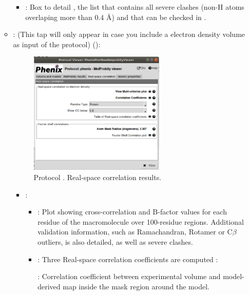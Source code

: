 \begin{itemize}
\begin{itemize}
\begin{itemize}
         \item {}: Box to detail , the list that contains all severe clashes (non-H atoms overlaping more than 0.4 \AA) and that can be checked in \coot.
        \end{itemize}
      \item {}: (This tap will only appear in case you include a electron density volume as input of the protocol) ():
       \begin{figure}[H]
         \centering 
         \captionsetup{width=.7\linewidth} 
         \includegraphics[width=0.65\textwidth]{Images_appendix/Fig146.pdf}
         \caption{Protocol . Real-space correlation results.}
         \label{fig:app_protocol_molprobity_4}
        \end{figure}
        \begin{itemize}
         \item {}: 
         \begin{itemize}
          \item {}: Plot showing cross-correlation and B-factor values for each residue of the macromolecule over 100-residue regions. Additional validation information, such as Ramachandran, Rotamer or C{$\beta$} outliers, is also detailed, as well as severe clashes.  
          \item {}: Three Real-space correlation coefficients are computed \citep{afonine2018b}: \setlength{\parindent}{12pt}
          
           : Correlation coefficient between experimental volume and model-derived map inside the mask region around the model.
           

\end{itemize}
\end{itemize}
\end{itemize}
\end{itemize}
